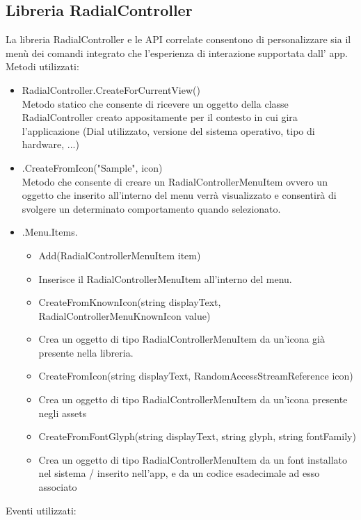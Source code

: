 \subsection{Libreria RadialController}
La libreria RadialController e le API correlate consentono di personalizzare sia il menù dei comandi integrato che l'esperienza di interazione supportata dall’ app.
Metodi utilizzati:
\begin{itemize}


\item RadialController.CreateForCurrentView()\\
Metodo statico che consente di ricevere un oggetto della classe RadialController creato appositamente per il contesto in cui gira l’applicazione (Dial utilizzato, versione del sistema operativo, tipo di hardware, ...)
\item .CreateFromIcon("Sample", icon)\\
Metodo che consente di creare un RadialControllerMenuItem ovvero un oggetto che inserito all’interno del menu verrà visualizzato e consentirà di svolgere un determinato comportamento quando selezionato.
\item .Menu.Items.
\begin{itemize}
\item Add(RadialControllerMenuItem item)
\item Inserisce il RadialControllerMenuItem all’interno del menu.
\item CreateFromKnownIcon(string displayText, RadialControllerMenuKnownIcon value)
\item Crea un oggetto di tipo RadialControllerMenuItem da un’icona già presente nella libreria.
\item CreateFromIcon(string displayText, RandomAccessStreamReference icon)
\item Crea un oggetto di tipo RadialControllerMenuItem da un’icona presente negli assets
\item CreateFromFontGlyph(string displayText, string glyph, string fontFamily)
\item Crea un oggetto di tipo RadialControllerMenuItem da un font installato nel sistema / inserito nell’app, e da un codice esadecimale ad esso associato
\end{itemize}
\end{itemize}
Eventi utilizzati:
